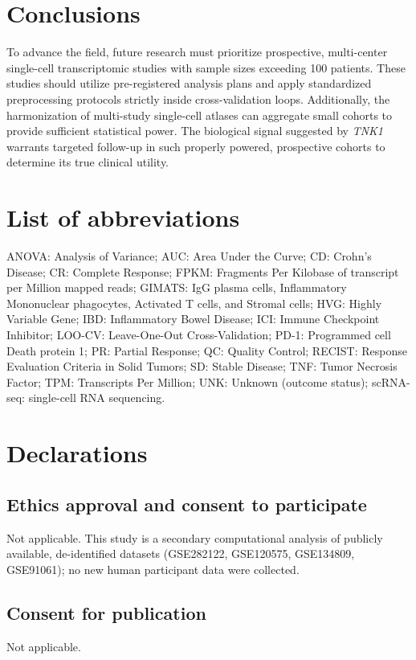 \documentclass{bmcart}
\begin{document}
\section*{Conclusions}
To advance the field, future research must prioritize prospective, multi-center single-cell transcriptomic studies with sample sizes exceeding 100 patients. These studies should utilize pre-registered analysis plans and apply standardized preprocessing protocols strictly inside cross-validation loops. Additionally, the harmonization of multi-study single-cell atlases can aggregate small cohorts to provide sufficient statistical power. The biological signal suggested by \textit{TNK1} warrants targeted follow-up in such properly powered, prospective cohorts to determine its true clinical utility.

\begin{backmatter}

\section*{List of abbreviations}
ANOVA: Analysis of Variance; AUC: Area Under the Curve; CD: Crohn's Disease; CR: Complete Response; FPKM: Fragments Per Kilobase of transcript per Million mapped reads; GIMATS: IgG plasma cells, Inflammatory Mononuclear phagocytes, Activated T cells, and Stromal cells; HVG: Highly Variable Gene; IBD: Inflammatory Bowel Disease; ICI: Immune Checkpoint Inhibitor; LOO-CV: Leave-One-Out Cross-Validation; PD-1: Programmed cell Death protein 1; PR: Partial Response; QC: Quality Control; RECIST: Response Evaluation Criteria in Solid Tumors; SD: Stable Disease; TNF: Tumor Necrosis Factor; TPM: Transcripts Per Million; UNK: Unknown (outcome status); scRNA-seq: single-cell RNA sequencing.

\section*{Declarations}

\subsection*{Ethics approval and consent to participate}
Not applicable. This study is a secondary computational analysis of publicly available, de-identified datasets (GSE282122, GSE120575, GSE134809, GSE91061); no new human participant data were collected.

\subsection*{Consent for publication}
Not applicable.


\end{backmatter}
\end{document}
